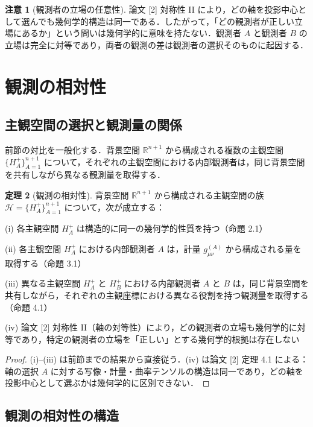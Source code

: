 \documentclass[a4paper,11pt]{ltjsarticle}
\theoremstyle{definition}
\newtheorem{theorem}{定理}[section]
\newtheorem{remark}[theorem]{注意}
\begin{document}
\begin{remark}[観測者の立場の任意性]
論文 {[2]} 対称性 II により，どの軸を投影中心として選んでも幾何学的構造は同一である．したがって，「どの観測者が正しい立場にあるか」という問いは幾何学的に意味を持たない．観測者 \(A\) と観測者 \(B\) の立場は完全に対等であり，両者の観測の差は観測者の選択そのものに起因する．
\end{remark}

\section{観測の相対性}

\subsection{主観空間の選択と観測量の関係}

前節の対比を一般化する．背景空間 \(\mathbb{R}^{n+1}\) から構成される複数の主観空間 \(\{H_A^+\}_{A=1}^{n+1}\) について，それぞれの主観空間における内部観測者は，同じ背景空間を共有しながら異なる観測量を取得する．

\begin{theorem}[観測の相対性]
背景空間 \(\mathbb{R}^{n+1}\) から構成される主観空間の族 \(\mathcal{H} = \{H_A^+\}_{A=1}^{n+1}\) について，次が成立する：

\textup{(i)} 各主観空間 \(H_A^+\) は構造的に同一の幾何学的性質を持つ（命題 2.1）

\textup{(ii)} 各主観空間 \(H_A^+\) における内部観測者 \(A\) は，計量 \(g_{\mu\nu}^{(A)}\) から構成される量を取得する（命題 3.1）

\textup{(iii)} 異なる主観空間 \(H_A^+\) と \(H_B^+\) における内部観測者 \(A\) と \(B\) は，同じ背景空間を共有しながら，それぞれの主観座標における異なる役割を持つ観測量を取得する（命題 4.1）

\textup{(iv)} 論文 {[2]} 対称性 II（軸の対等性）により，どの観測者の立場も幾何学的に対等であり，特定の観測者の立場を「正しい」とする幾何学的根拠は存在しない
\end{theorem}

\begin{proof}
(i)--(iii) は前節までの結果から直接従う．(iv) は論文 {[2]} 定理 4.1 による：軸の選択 \(A\) に対する写像・計量・曲率テンソルの構造は同一であり，どの軸を投影中心として選ぶかは幾何学的に区別できない．
\end{proof}

\subsection{観測の相対性の構造}
\end{document}
